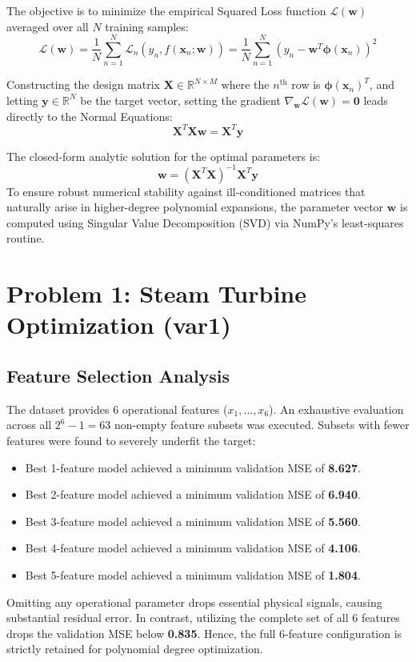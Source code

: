 \documentclass[12pt]{article}
\begin{document}
The objective is to minimize the empirical Squared Loss function $\mathcal{L}(\mathbf{w})$ averaged over all $N$ training samples:
\begin{equation}
\mathcal{L}(\mathbf{w}) = \frac{1}{N} \sum_{n=1}^{N} \mathcal{L}_n(y_n, f(\mathbf{x}_n; \mathbf{w})) = \frac{1}{N} \sum_{n=1}^{N} (y_n - \mathbf{w}^T \boldsymbol{\phi}(\mathbf{x}_n))^2
\end{equation}

Constructing the design matrix $\mathbf{X} \in \mathbb{R}^{N \times M}$ where the $n^{\text{th}}$ row is $\boldsymbol{\phi}(\mathbf{x}_n)^T$, and letting $\mathbf{y} \in \mathbb{R}^N$ be the target vector, setting the gradient $\nabla_{\mathbf{w}} \mathcal{L}(\mathbf{w}) = \mathbf{0}$ leads directly to the Normal Equations:
\begin{equation}
\mathbf{X}^T \mathbf{X} \mathbf{w} = \mathbf{X}^T \mathbf{y}
\end{equation}

The closed-form analytic solution for the optimal parameters is:
\begin{equation}
\mathbf{w} = (\mathbf{X}^T \mathbf{X})^{-1} \mathbf{X}^T \mathbf{y}
\end{equation}
To ensure robust numerical stability against ill-conditioned matrices that naturally arise in higher-degree polynomial expansions, the parameter vector $\mathbf{w}$ is computed using Singular Value Decomposition (SVD) via NumPy's least-squares routine.

\section{Problem 1: Steam Turbine Optimization (var1)}

\subsection{Feature Selection Analysis}
The dataset provides 6 operational features ($x_1, \dots, x_6$). An exhaustive evaluation across all $2^6 - 1 = 63$ non-empty feature subsets was executed. Subsets with fewer features were found to severely underfit the target:
\begin{itemize}
    \item Best 1-feature model achieved a minimum validation MSE of \textbf{8.627}.
    \item Best 2-feature model achieved a minimum validation MSE of \textbf{6.940}.
    \item Best 3-feature model achieved a minimum validation MSE of \textbf{5.560}.
    \item Best 4-feature model achieved a minimum validation MSE of \textbf{4.106}.
    \item Best 5-feature model achieved a minimum validation MSE of \textbf{1.804}.
\end{itemize}
Omitting any operational parameter drops essential physical signals, causing substantial residual error. In contrast, utilizing the complete set of all 6 features drops the validation MSE below \textbf{0.835}. Hence, the full 6-feature configuration is strictly retained for polynomial degree optimization.
\end{document}
